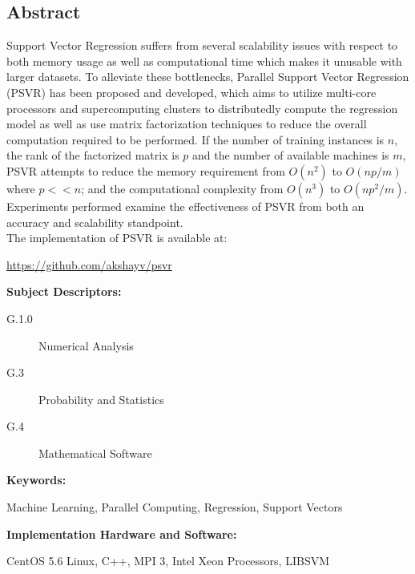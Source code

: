 \documentclass[12pt]{article}
\begin{document}
\newpage
{}
\begin{center}
\section*{Abstract}
%
\end{center}
\begin{adjustwidth}{2 cm}{2 cm} 
Support Vector Regression suffers from several scalability issues with respect to both memory usage as well as computational time which makes it unusable with larger datasets. To alleviate these bottlenecks, Parallel Support Vector Regression (PSVR) has been proposed and developed, which aims to utilize multi-core processors and supercomputing clusters to distributedly compute the regression model as well as use matrix factorization techniques to reduce the overall computation required to be performed. If the number of training instances is $n$, the rank of the factorized matrix is $p$ and the number of available machines is $m$, PSVR attempts to reduce the memory requirement from $O(n^2)$ to $O(np/m)$ where $p << n$; and the computational complexity from $O(n^3)$ to $O(np^2/m)$. Experiments performed examine the effectiveness of PSVR from both an accuracy and scalability standpoint.\\
The implementation of PSVR is available at:
\begin{center}
 \url{https://github.com/akshayv/psvr}
 \end{center}
\end{adjustwidth}
\vspace{1 cm} 

\begin{adjustwidth}{0 cm}{0 cm}
{\bf Subject Descriptors:} 
\end{adjustwidth}
\begin{adjustwidth}{2 cm}{2 cm}
\begin{description}
\item[G.1.0]	 Numerical Analysis
\item[G.3]    Probability and Statistics
\item[G.4] Mathematical Software
\end{description}
\end{adjustwidth}
{\bf Keywords:} 
\begin{adjustwidth}{2 cm}{2 cm}
Machine Learning, Parallel Computing, Regression, Support Vectors\\
\end{adjustwidth} 
{\bf Implementation Hardware and Software:}
\begin{adjustwidth}{2 cm}{2 cm}
CentOS 5.6 Linux, C++, MPI 3, Intel Xeon Processors, LIBSVM
\end{adjustwidth} 
\newpage
\end{document}
